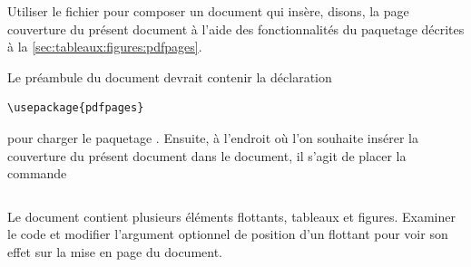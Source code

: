 \begin{exercice}
  Utiliser le fichier  pour composer un
  document qui insère, disons, la page couverture du présent document
  à l'aide des fonctionnalités du paquetage  décrites à
  la \autoref{sec:tableaux:figures:pdfpages}.
  \begin{sol}
    Le préambule du document devrait contenir la déclaration
\begin{lstlisting}
\usepackage{pdfpages}
\end{lstlisting}
    pour charger le paquetage . Ensuite, à l'endroit où
    l'on souhaite insérer la couverture du présent document dans le
    document, il s'agit de placer la commande
\begin{lstlisting}

\end{lstlisting}
  \end{sol}
\end{exercice}

\begin{exercice}[nosol]
  Le document  contient plusieurs éléments
  flottants, tableaux et figures. Examiner le code et modifier
  l'argument optionnel de position d'un flottant pour voir son effet
  sur la mise en page du document.
\end{exercice}



